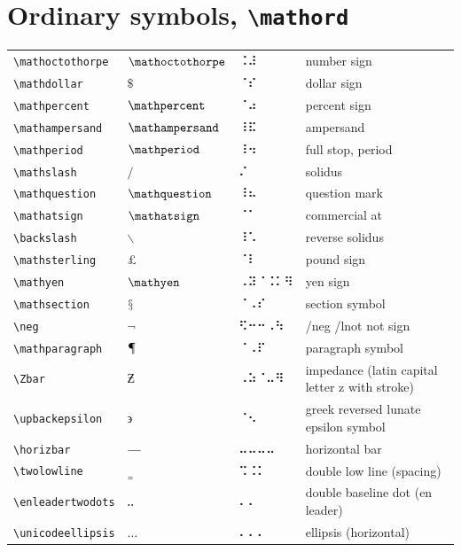 \documentclass[oneside]{article}
\begin{document}
\clearpage

\section{Ordinary symbols,  \texttt{\textbackslash{}mathord}}

\begin{longtable}{llll}
\verb|\mathoctothorpe| & $\mathoctothorpe$ &  ⠨⠼  & {number sign} \\[2ex]
\verb|\mathdollar| & $\mathdollar$ &  ⠈⠎  & {dollar sign} \\[2ex]
\verb|\mathpercent| & $\mathpercent$ &  ⠈⠴  & {percent sign} \\[2ex]
\verb|\mathampersand| & $\mathampersand$ &  ⠸⠯  & {ampersand} \\[2ex]
\verb|\mathperiod| & $\mathperiod$ &  ⠸⠲  & {full stop, period} \\[2ex]
\verb|\mathslash| & $\mathslash$ &  ⠌  & {solidus} \\[2ex]
\verb|\mathquestion| & $\mathquestion$ &  ⠸⠦  & {question mark} \\[2ex]
\verb|\mathatsign| & $\mathatsign$ &  ⠈⠁  & {commercial at} \\[2ex]
\verb|\backslash| & $\backslash$ &  ⠸⠡  & {reverse solidus} \\[2ex]
\verb|\mathsterling| & $\mathsterling$ &  ⠈⠇  & {pound sign} \\[2ex]
\verb|\mathyen| & $\mathyen$ &  ⠠⠽⠈⠨⠅⠻  & {yen sign} \\[2ex]
\verb|\mathsection| & $\mathsection$ &  ⠈⠠⠎  & {section symbol} \\[2ex]
\verb|\neg| & $\neg$ &  ⠫⠒⠒⠠⠳  & {/neg /lnot not sign} \\[2ex]
\verb|\mathparagraph| & $\mathparagraph$ &  ⠈⠠⠏  & {paragraph symbol} \\[2ex]
\verb|\Zbar| & $\Zbar$ &  ⠠⠵⠈⠤⠻  & {impedance (latin capital letter z with stroke)} \\[2ex]
\verb|\upbackepsilon| & $\upbackepsilon$ &  ⠈⠢  & {greek reversed lunate epsilon symbol} \\[2ex]
\verb|\horizbar| & $\horizbar$ &  ⠤⠤⠤⠤  & {horizontal bar} \\[2ex]
\verb|\twolowline| & $\twolowline$ &   ⠩⠨⠅  & {double low line (spacing)} \\[2ex]
\verb|\enleadertwodots| & $\enleadertwodots$ &  ⠄⠄  & {double baseline dot (en leader)} \\[2ex]
\verb|\unicodeellipsis| & $\unicodeellipsis$ &  ⠄⠄⠄  & {ellipsis (horizontal)} \\[2ex]

\end{longtable}
\end{document}
